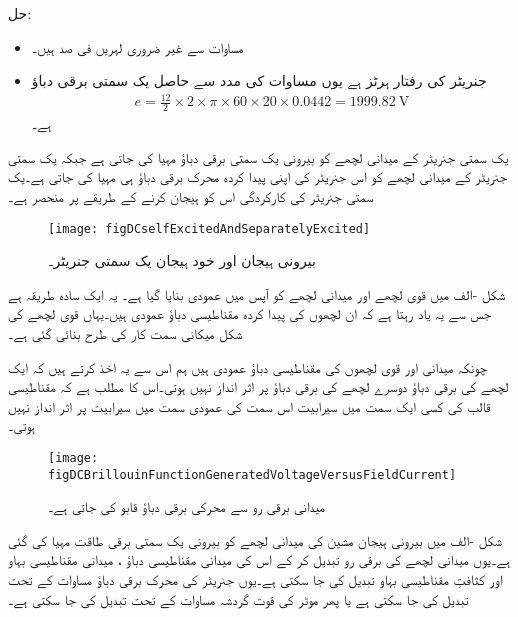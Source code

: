 حل:
\begin{itemize}
\item
مساوات   سے غیر ضروری لہریں  فی صد ہیں۔
\item
جنریٹر کی رفتار  ہرٹز ہے یوں مساوات   کی مدد سے حاصل یک سمتی برقی دباؤ
\begin{align*}
e=\frac{12}{2} \times 2 \times \pi \times 60 \times 20 \times 0.0442=\SI{1999.82}{\volt}
\end{align*}
ہے۔
\end{itemize}
%
 یک سمتی جنریٹر کے میدانی لچھے کو بیرونی یک سمتی برقی دباؤ مہیا کی جاتی ہے جبکہ  یک سمتی جنریٹر کے میدانی لچھے کو اس جنریٹر کی اپنی پیدا کردہ محرک برقی دباؤ ہی مہیا کی جاتی ہے۔یک سمتی جنریٹر کی کارکردگی اس کو ہیجان کرنے کے طریقے پر منحصر ہے۔
\begin{figure}
\centering
\texttt{[image: figDCselfExcitedAndSeparatelyExcited]}
\caption{بیرونی ہیجان اور خود ہیجان یک سمتی جنریٹر۔}
\label{شکل_یکسمتی_خود_ہیجان_بیرونی_ہیجان}
\end{figure}

شکل -الف میں قوی لچھے اور میدانی لچھے کو آپس میں عمودی بنایا گیا ہے۔ یہ ایک سادہ طریقہ ہے جس سے یہ یاد رہتا ہے کہ ان لچھوں کی پیدا کردہ مقناطیسی دباؤ عمودی ہیں۔یہاں قوی لچھے کی شکل میکانی سمت کار کی طرح بنائی گئی ہے۔

چونکہ میدانی اور قوی لچھوں کی مقناطیسی دباؤ عمودی ہیں ہم اس سے یہ اخذ کرتے ہیں کہ ایک لچھے کی برقی دباؤ دوسرے لچھے کی برقی دباؤ پر اثر انداز نہیں ہوتی۔اس کا مطلب ہے کہ مقناطیسی قالب کی کسی ایک سمت میں  سیرابیت اس سمت کی عمودی سمت میں سیرابیت پر اثر انداز نہیں ہوتی۔

\begin{figure}
\centering
\texttt{[image: figDCBrillouinFunctionGeneratedVoltageVersusFieldCurrent]}
\caption{میدانی برقی رو سے محرکی برقی دباؤ قابو کی جاتی ہے۔}
\label{شکل_یکسمتی_پیدا_برقی_دباؤ_بالمقابل_میدانی_رو}
\end{figure}
شکل -الف میں بیرونی ہیجان مشین کی میدانی لچھے کو بیرونی یک سمتی برقی طاقت مہیا کی گئی ہے۔یوں میدانی لچھے کی برقی رو تبدیل کر کے اس کی میدانی مقناطیسی دباؤ  ، میدانی مقناطیسی بہاو   اور کثافتِ مقناطیسی بہاو   تبدیل کی جا سکتی ہے۔یوں جنریٹر کی محرک برقی دباؤ مساوات   کے تحت تبدیل کی جا سکتی ہے یا پھر موٹر کی قوت گردشہ مساوات   کے تحت تبدیل کی جا سکتی ہے۔

